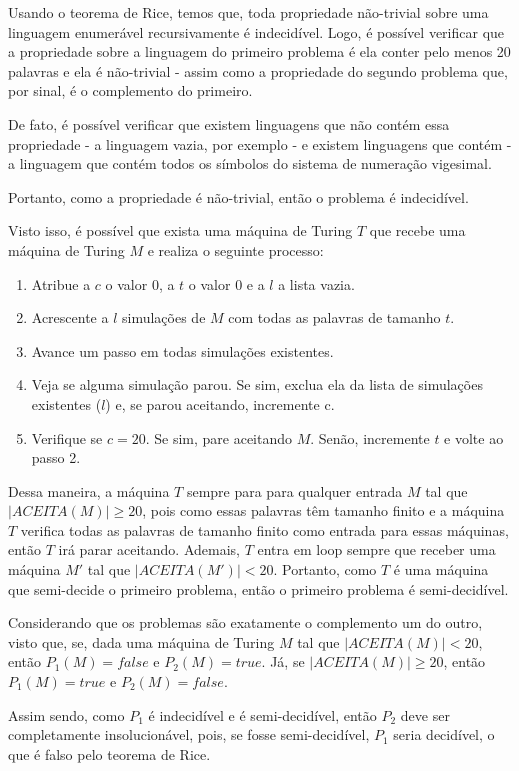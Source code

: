 \documentclass{article}
\begin{document}
  {
  \color{blue}
    \par Usando o teorema de Rice, temos que, toda propriedade não-trivial sobre uma linguagem enumerável recursivamente é indecidível. Logo, é possível verificar que a propriedade sobre a linguagem do primeiro problema é ela conter pelo menos 20 palavras e ela é não-trivial - assim como a propriedade do segundo problema que, por sinal, é o complemento do primeiro.
    \par De fato, é possível verificar que existem linguagens que não contém essa propriedade - a linguagem vazia, por exemplo - e existem linguagens que contém - a linguagem que contém todos os símbolos do sistema de numeração vigesimal.
    \par Portanto, como a propriedade é não-trivial, então o problema é indecidível.
    \par Visto isso, é possível que exista uma máquina de Turing $T$ que recebe uma máquina de Turing $M$ e realiza o seguinte processo:
    \begin{enumerate}
      \item Atribue a $c$ o valor $0$, a $t$ o valor $0$ e a $l$ a lista vazia.
      \item Acrescente a $l$ simulações de $M$ com todas as palavras de tamanho $t$.
      \item Avance um passo em todas simulações existentes.
      \item Veja se alguma simulação parou. Se sim, exclua ela da lista de simulações existentes ($l$) e, se parou aceitando, incremente c.
      \item Verifique se $c = 20$. Se sim, pare aceitando $M$. Senão, incremente $t$ e volte ao passo 2.
    \end{enumerate}
    \par Dessa maneira, a máquina $T$ sempre para para qualquer entrada $M$ tal que $|ACEITA(M)| \geq 20$, pois como essas palavras têm tamanho finito e a máquina $T$ verifica todas as palavras de tamanho finito como entrada para essas máquinas, então $T$ irá parar aceitando. Ademais, $T$ entra em loop sempre que receber uma máquina $M'$ tal que $|ACEITA(M')| < 20$. Portanto, como $T$ é uma máquina que semi-decide o primeiro problema, então o primeiro problema é semi-decidível.
    \par Considerando que os problemas são exatamente o complemento um do outro, visto que, se, dada uma máquina de Turing $M$ tal que $|ACEITA(M)| < 20$, então $P_1(M) = false$ e $P_2(M) = true$. Já, se $|ACEITA(M)| \geq 20$, então $P_1(M) = true$ e $P_2(M) = false$.
    \par Assim sendo, como $P_1$ é indecidível e é semi-decidível, então $P_2$ deve ser completamente insolucionável, pois, se fosse semi-decidível, $P_1$ seria decidível, o que é falso pelo teorema de Rice.
  }
\end{document}
